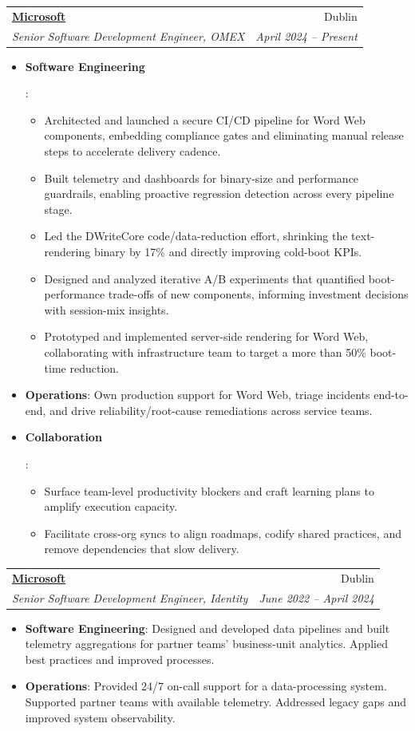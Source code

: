 \documentclass[letterpaper,11pt]{article}
\makeatletter
\newcommand{\resumeItem}[2]{
  \item\small{
    \textbf{#1}{: #2 \vspace{-2pt}}
  }
}
\newcommand{\resumeSubheading}[4]{
  \vspace{-1pt}\item
    \begin{tabular*}{0.97\textwidth}{l@{\extracolsep{\fill}}r}
      \textbf{#1} & #2 \\
      \textit{\small#3} & \textit{\small #4} \\
    \end{tabular*}\vspace{-5pt}
}
\newcommand{\resumeItemListStart}{\begin{itemize}}
\newcommand{\resumeItemListEnd}{\end{itemize}\vspace{-5pt}}
\makeatother
\begin{document}
  \resumeSubheading
      {\href{https://microsoft.com/}{Microsoft}}{Dublin}
      {Senior Software Development Engineer, OMEX}{April 2024 -- Present}
      \resumeItemListStart
        \resumeItem{Software Engineering}{
          \begin{itemize}
            \item Architected and launched a secure CI/CD pipeline for Word Web components, embedding compliance gates and eliminating manual release steps to accelerate delivery cadence.
            \item Built telemetry and dashboards for binary-size and performance guardrails, enabling proactive regression detection across every pipeline stage.
            \item Led the DWriteCore code/data-reduction effort, shrinking the text-rendering binary by 17\% and directly improving cold-boot KPIs.
            \item Designed and analyzed iterative A/B experiments that quantified boot-performance trade-offs of new components, informing investment decisions with session-mix insights.
            \item Prototyped and implemented server-side rendering for Word Web, collaborating with infrastructure team to target a more than 50\% boot-time reduction.
          \end{itemize}
        }
        \resumeItem{Operations}
                    {Own production support for Word Web, triage incidents end-to-end, and drive reliability/root-cause remediations across service teams.}
        \resumeItem{Collaboration} {
          \begin{itemize}
            \item Surface team-level productivity blockers and craft learning plans to amplify execution capacity.
            \item Facilitate cross-org syncs to align roadmaps, codify shared practices, and remove dependencies that slow delivery.
          \end{itemize}
        }
    \resumeItemListEnd

   \resumeSubheading
      {\href{https://microsoft.com/}{Microsoft}}{Dublin}
      {Senior Software Development Engineer, Identity}{June 2022 -- April 2024}
      \resumeItemListStart
        \resumeItem{Software Engineering}
                   {Designed and developed data pipelines and built telemetry aggregations for partner teams' business-unit analytics. Applied best practices and improved processes.}
        \resumeItem{Operations}
                   {Provided 24/7 on-call support for a data-processing system. Supported partner teams with available telemetry. Addressed legacy gaps and improved system observability.}
    \resumeItemListEnd
\end{document}

